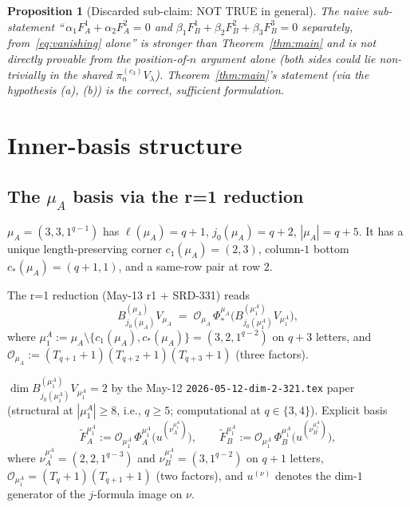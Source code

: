 \documentclass[11pt]{article}
\newtheorem{proposition}[theorem]{Proposition}
\theoremstyle{definition}
\begin{document}
\begin{proposition}[Discarded sub-claim: NOT TRUE in general]\label{prop:discard}
The naive sub-statement ``\,$\alpha_1 F_A^1 + \alpha_2 F_A^2 = 0$ and
$\beta_1 F_B^1 + \beta_2 F_B^2 + \beta_3 F_B^3 = 0$ separately,
from~\eqref{eq:vanishing} alone'' is \emph{stronger than}
Theorem~\ref{thm:main} and is not directly provable from the
position-of-$n$ argument alone (both sides could lie non-trivially
in the shared $\pi^{(c_3)}_n V_\lambda$). Theorem~\ref{thm:main}'s
statement (via the hypothesis (a), (b)) is the correct, sufficient
formulation.
\end{proposition}


\section{Inner-basis structure}\label{sec:inner-basis}

\subsection{The $\mu_A$ basis via the r=1 reduction}\label{sec:muA-basis}

$\mu_A = (3, 3, 1^{q-1})$ has $\ell(\mu_A) = q+1$, $j_0(\mu_A) = q+2$,
$|\mu_A| = q+5$. It has a unique length-preserving corner
$c_1(\mu_A) = (2, 3)$, column-$1$ bottom $c_*(\mu_A) = (q+1, 1)$, and
a same-row pair at row $2$.

The r=1 reduction (May-13 r1 + SRD-331) reads
\begin{equation}\label{eq:muA-reduction}
   B^{(\mu_A)}_{j_0(\mu_A)} V_{\mu_A}
   \;=\;
   \mathcal{O}_{\mu_A}\, \Phi_*^{\mu_A}\big(B^{(\mu_1^A)}_{j_0(\mu_1^A)} V_{\mu_1^A}\big),
\end{equation}
where $\mu_1^A := \mu_A \setminus \{c_1(\mu_A), c_*(\mu_A)\}
= (3, 2, 1^{q-2})$ on $q+3$ letters, and
$\mathcal{O}_{\mu_A} := (T_{q+1}{+}1)(T_{q+2}{+}1)(T_{q+3}{+}1)$
(three factors).

$\dim B^{(\mu_1^A)}_{j_0(\mu_1^A)} V_{\mu_1^A} = 2$ by the
May-12 \texttt{2026-05-12-dim-2-321.tex} paper (structural at
$|\mu_1^A| \ge 8$, i.e., $q \ge 5$; computational at $q \in \{3, 4\}$).
Explicit basis
\[
   \widetilde F_A^{\mu_1^A} := \mathcal{O}_{\mu_1^A}\,
        \Phi_A^{\mu_1^A}\big(u^{(\nu_A^{\mu_1^A})}\big),
   \qquad
   \widetilde F_B^{\mu_1^A} := \mathcal{O}_{\mu_1^A}\,
        \Phi_B^{\mu_1^A}\big(u^{(\nu_B^{\mu_1^A})}\big),
\]
where $\nu_A^{\mu_1^A} = (2, 2, 1^{q-3})$ and $\nu_B^{\mu_1^A} = (3, 1^{q-2})$
on $q+1$ letters, $\mathcal{O}_{\mu_1^A} = (T_q{+}1)(T_{q+1}{+}1)$
(two factors), and $u^{(\nu)}$ denotes the dim-$1$ generator of the
$j$-formula image on $\nu$.
\end{document}
